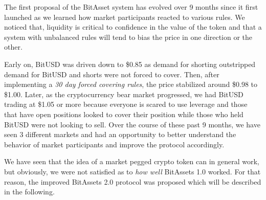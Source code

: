 \label{sec:bitassets1}

The first proposal of the BitAsset system has evolved over 9 months since it
first launched as we learned how market participants reacted to various rules.
We noticed that, liquidity is critical to confidence in the value of the token
and that a system with unbalanced rules will tend to bias the price in one
direction or the other.

Early on, BitUSD was driven down to \$0.85 as demand for shorting outstripped
demand for BitUSD and shorts were not forced to cover. Then, after implementing
a \emph{30 day forced covering rules}, the price stabilized around \$0.98 to
\$1.00. Later, as the cryptocurrency bear market progressed, we had BitUSD
trading at \$1.05 or more because everyone is scared to use leverage and those
that have open positions looked to cover their position while those who held
BitUSD were not looking to sell. Over the course of these past 9 months, we
have seen 3 different markets and had an opportunity to better understand the
behavior of market participants and improve the protocol accordingly.

We have seen that the idea of a market pegged crypto token can in general work,
but obviously, we were not satisfied as to \emph{how well} BitAssets 1.0
worked. For that reason, the improved BitAssets 2.0 protocol was proposed which
will be described in the following.

